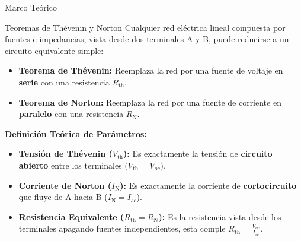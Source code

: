 \documentclass[10pt, aspectratio=169]{beamer}
\begin{document}
\begin{frame}{Marco Teórico}
    \begin{boxTeoria}{Teoremas de Thévenin y Norton}
        \small
        Cualquier red eléctrica lineal compuesta por fuentes e impedancias, vista desde dos terminales A y B, puede reducirse a un circuito equivalente simple:

        \begin{itemize}
            \item \textbf{Teorema de Thévenin:} Reemplaza la red por una fuente de voltaje en \textbf{serie} con una resistencia $R_{\text{th}}$.
            \item \textbf{Teorema de Norton:} Reemplaza la red por una fuente de corriente en \textbf{paralelo} con una resistencia $R_{\text{N}}$.
        \end{itemize}

        \vspace{0.15cm}
        \textbf{Definición Teórica de Parámetros:}
        \begin{itemize}
            \item \textbf{Tensión de Thévenin ($V_{\text{th}}$):} Es exactamente la tensión de \textbf{circuito abierto} entre los terminales ($V_{\text{th}} = V_{oc}$).
            \item \textbf{Corriente de Norton ($I_{\text{N}}$):} Es exactamente la corriente de \textbf{cortocircuito} que fluye de A hacia B ($I_{\text{N}} = I_{sc}$).
            \item \textbf{Resistencia Equivalente ($R_{\text{th}} = R_{\text{N}}$):} Es la resistencia vista desde los terminales apagando fuentes independientes, esta comple $R_{\text{th}} = \frac{V_{oc}}{I_{sc}}$.
        \end{itemize}
    \end{boxTeoria}
\end{frame}
\end{document}

